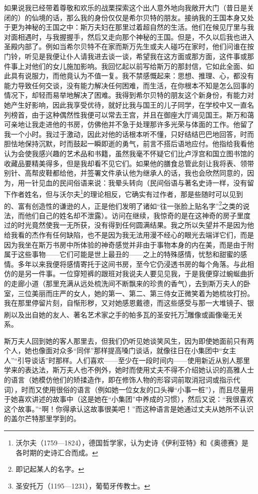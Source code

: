 \par 如果说我已经带着尊敬和欢乐的战栗探索这个出人意外地向我敞开大门（昔日是关闭的）的仙境的话，那么我的身份仅仅是希尔贝特的朋友。接纳我的王国本身又处于更为神秘的王国之中：斯万夫妇在那里过着超自然的生活。他们在候见厅里与我对面相遇时，与我握握手，然后又走向那个神秘的王国。但是，不久以后我也进入圣殿内部了。例如当希尔贝特不在家而斯万先生或夫人碰巧在家时，他们问谁在按门铃，听见是我便让仆人请我进去谈一谈，希望我在这方面或那方面，这件事或那件事上对他们的女儿施加影响。我回忆起以前写给斯万的那封信，它如此全面、如此具有说服力，而他竟认为不值一复。我不禁感慨起来：思想、推理、心，都没有能力导致任何交谈，没有能力解决任何困难，而生活，在你根本不知是怎么回事的情况下，却轻而易举地解决了困难。我得到希尔贝特的朋友这个新身份，有能力对她产生好影响，因此我享受优待，就好比我与国王的儿子同学，在学校中又一直名列榜首，由于这种偶然性我便可以常去王宫，并且在御座大厅谒见国王。斯万和蔼可亲地让我走进他的书房，仿佛他并不急于处理那许多光荣与体面的工作。他留了我一个小时。我过于激动，因此对他的话根本听不懂，只好结结巴巴地回答，时而胆怯地保持沉默，时而鼓起一瞬即逝的勇气，前言不搭后语地应付。他指给我看他认为会使我感兴趣的艺术品和书籍，虽然我毫不怀疑它们比卢浮宫和国立图书馆的收藏品要精美得多，但是我却看不见它们。如果他的膳食总管此刻让我将表、领带别针、高帮皮鞋都给他，并签署文件承认他为继承人的话，我也会欣然同意的，因为，用一针见血的民间俗语来说：我晕头转向（民间俗语与著名史诗一样，没有留下作者姓名，但与沃尔夫\footnote{沃尔夫（1759—1824），德国哲学家，认为史诗《伊利亚特》和《奥德赛》是各时期的史诗汇合而成。}的理论相反，它确实有过作者，那是些随时可以见到的、富有创造性的谦逊的人，正是他们发明了诸如“往一张脸上贴名字”\footnote{即记起某人的名字。}之类的说法，而他们自己的姓名却不泄露）。访问在继续，我惊奇的是在这神奇的房子里度过的时光竟然使我一无所获，没有得到任何圆满结果。我之所以失望并不是因为他给我看的杰作有任何缺陷，也不是因为我无法用漫不经心的眼光去端详它们，而是因为我坐在斯万书房中所体验的神奇感觉并非由于事物本身的内在美，而是由于附属于这些事物——它们可能是世上最丑的——之上的特殊感情，忧愁和甜蜜的感情。多年以来我便将感情寄托于这间书房，至今它仍浸透书房的每个角落。与此相仿的是另一件事。一位穿短裤的跟班对我说夫人要见见我，于是我便穿过蜿蜒曲折的走廊小道（那里充满从远处梳洗间不断飘来的珍贵的香气），去到斯万夫人的卧室，三位美丽而庄严的女人，她的第一、第二、第三侍女正微笑着为她梳妆打扮。我在那里停留片刻，自惭形秽，又对她感恩戴德，而这些感受与那一大堆镜子、银刷以及出自她的友人、著名艺术家之手的帕多瓦的圣安托万\footnote{圣安托万（1195—1231），葡萄牙传教士。}雕像或画像毫无关系。
\par 斯万夫人回到她的客人那里去，但我们仍听见她谈笑风生，因为即使她面前只有两个人，她也像面对众多“同伴”那样提高嗓门谈话，就像往日在小集团中“女主人”“引导谈话”时那样。人们喜欢——至少在一段时间内——使用新近从别人那里学来的表达法，斯万夫人也不例外，她时而使用丈夫不得不介绍她认识的高雅人士的语言（她模仿他们的矫揉造作，即在修饰人物的形容词前取消冠词或指示代词），时而又使用很俗的语言（例如她一位女友的口头禅“小事一桩”），而且尽量用于她喜欢讲述的故事中（这是她在“小集团”中养成的习惯），然后又说：“我很喜欢这个故事。”“啊！你得承认这故事很美吧！”而这种语言是她通过丈夫从她所不认识的盖尔芒特那里学到的。
